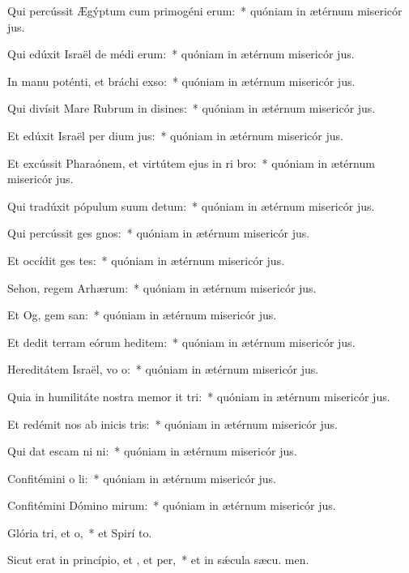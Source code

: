 \item Qui percússit Ægýptum cum primogéni erum:~* quóniam in ætérnum misericór jus.
\item Qui edúxit Israël de médi erum:~* quóniam in ætérnum misericór jus.
\item In manu poténti, et bráchi exso:~* quóniam in ætérnum misericór jus.
\item Qui divísit Mare Rubrum in disines:~* quóniam in ætérnum misericór jus.
\item Et edúxit Israël per dium jus:~* quóniam in ætérnum misericór jus.
\item Et excússit Pharaónem, et virtútem ejus in ri bro:~* quóniam in ætérnum misericór jus.
\item Qui tradúxit pópulum suum  detum:~* quóniam in ætérnum misericór jus.
\item Qui percússit ges gnos:~* quóniam in ætérnum misericór jus.
\item Et occídit ges tes:~* quóniam in ætérnum misericór jus.
\item Sehon, regem Arhærum:~* quóniam in ætérnum misericór jus.
\item Et Og, gem san:~* quóniam in ætérnum misericór jus.
\item Et dedit terram eórum heditem:~* quóniam in ætérnum misericór jus.
\item Hereditátem Israël, vo o:~* quóniam in ætérnum misericór jus.
\item Quia in humilitáte nostra memor it tri:~* quóniam in ætérnum misericór jus.
\item Et redémit nos ab inicis tris:~* quóniam in ætérnum misericór jus.
\item Qui dat escam ni ni:~* quóniam in ætérnum misericór jus.
\item Confitémini o li:~* quóniam in ætérnum misericór jus.
\item Confitémini Dómino mirum:~* quóniam in ætérnum misericór jus.
\item Glória tri, et o,~* et Spirí to.
\item Sicut erat in princípio, et , et per,~* et in sǽcula sæcu. men.
